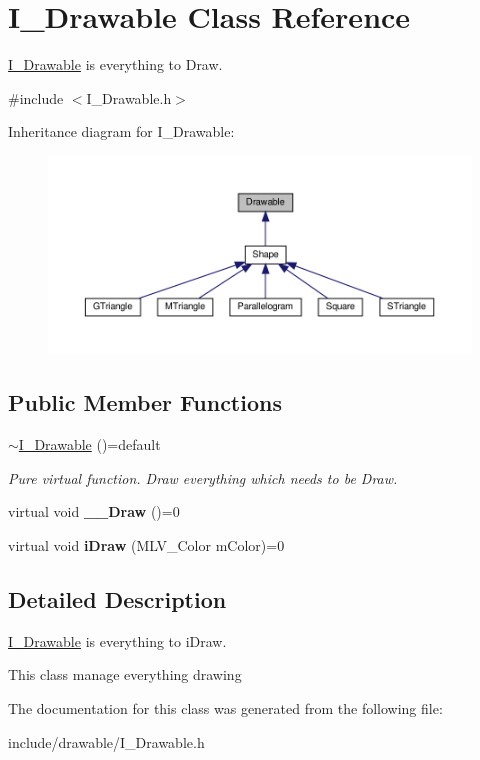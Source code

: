 \hypertarget{classDrawable}{}\section{I_Drawable Class Reference}
\label{classDrawable}


\hyperlink{classDrawable}{I_Drawable} is everything to Draw.




{\ttfamily \#include $<$I_Drawable.\+h$>$}



Inheritance diagram for I_Drawable\+:\nopagebreak
\begin{figure}[H]
\begin{center}
\leavevmode
\includegraphics[width=350pt]{classDrawable__inherit__graph}
\end{center}
\end{figure}
\subsection*{Public Member Functions}
\begin{DoxyCompactItemize}
\item 
\mbox{\label{classDrawable_a313ec095ce0ea2a8c7cac78a6be27be8}} 
\hyperlink{classDrawable_a313ec095ce0ea2a8c7cac78a6be27be8}{$\sim$\+I_Drawable} ()=default
\begin{DoxyCompactList}\small\item\em Pure virtual function. Draw everything which needs to be Draw. \end{DoxyCompactList}\item
\mbox{\label{classDrawable_aa37d7b328240d343134adcfe5e4dcd38}} 
virtual void {\bfseries __Draw} ()=0
\item 
\mbox{\label{classDrawable_aa45b93aaf493419c15c240702aa9f692}} 
virtual void {\bfseries iDraw} (M\+L\+V\+\_\+\+Color mColor)=0
\end{DoxyCompactItemize}


\subsection{Detailed Description}
\hyperlink{classDrawable}{I_Drawable} is everything to iDraw.

This class manage everything drawing 

The documentation for this class was generated from the following file\+:\begin{DoxyCompactItemize}
\item 
include/drawable/I_Drawable.\+h\end{DoxyCompactItemize}
